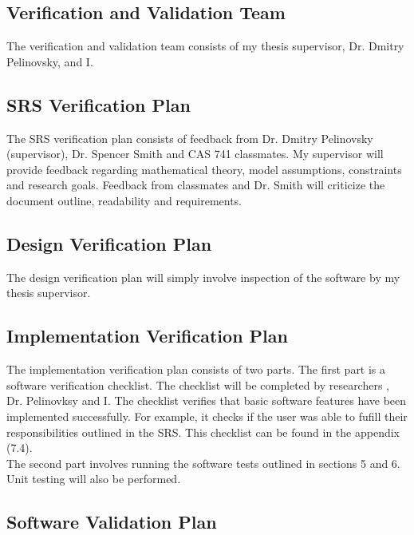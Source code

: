 \documentclass[12pt, titlepage]{article}
\begin{document}
\subsection{Verification and Validation Team}

The verification and validation team consists of my thesis supervisor, Dr. 
Dmitry Pelinovsky, and I. \\

\subsection{SRS Verification Plan}

The SRS verification plan consists of feedback from Dr. Dmitry Pelinovsky 
(supervisor), Dr. Spencer Smith and CAS 741 classmates. My supervisor will 
provide feedback regarding mathematical theory, model assumptions, constraints 
and research goals. Feedback from classmates and Dr. Smith will criticize the 
document outline, readability and requirements. 

\subsection{Design Verification Plan}

The design verification plan will simply involve inspection of the software by 
my thesis supervisor. 

\subsection{Implementation Verification Plan}

The implementation verification plan consists of two parts. The first part 
is a software verification checklist. The checklist will be completed by 
researchers , Dr. Pelinovksy and I. The 
checklist verifies that basic software features have been implemented 
successfully. 
For example, it checks if the user was able to fufill their responsibilities 
outlined in the SRS. 
This checklist can be found in the appendix (7.4).\\

 The 
second part involves running the software tests 
outlined in sections 5 and 6. Unit testing will also be performed. 

\subsection{Software Validation Plan}
\end{document}
